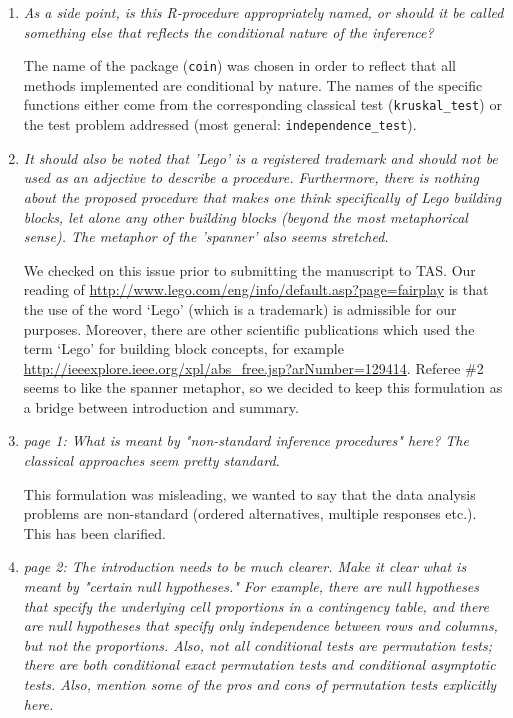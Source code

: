 \documentclass[11pt]{article}
\begin{document}
\begin{enumerate}
\item \textsl{As a side point, is this R-procedure appropriately named, or should it be called 
              something else that reflects the conditional nature of the inference?}

The name of the package (\texttt{coin}) was chosen in order to reflect that
all methods implemented are conditional by nature. The names of the specific
functions either come from the corresponding classical test
(\texttt{kruskal\_test}) or the test problem addressed (most general:
\texttt{independence\_test}).

\item \textsl{It should also be noted that 'Lego' is a registered trademark and should not be used 
              as an adjective to describe a procedure. Furthermore, there is nothing about the 
              proposed procedure that makes one think specifically of Lego building blocks, 
              let alone any other building blocks (beyond the most metaphorical sense). The 
              metaphor of the 'spanner' also seems stretched.}

We checked on this issue prior to submitting the manuscript to TAS. Our
reading of \url{http://www.lego.com/eng/info/default.asp?page=fairplay} is
that the use of the word `Lego' (which is a trademark) is admissible for our
purposes. Moreover, there are other scientific publications which used the
term `Lego' for building block concepts, for example
\url{http://ieeexplore.ieee.org/xpl/abs_free.jsp?arNumber=129414}.
Referee \#2 seems to like the spanner
metaphor, so we decided to keep this formulation as a bridge between
introduction and summary.


\item \textsl{page 1:  What is meant by "non-standard inference procedures" here? The classical 
              approaches seem pretty standard.}

This formulation was misleading, we wanted to say that the data analysis
problems are non-standard (ordered alternatives, multiple responses etc.).
This has been clarified.

\item \textsl{page 2:  The introduction needs to be much clearer. Make it clear what is meant by 
              "certain null hypotheses." For example, there are null hypotheses that specify the 
              underlying cell proportions in a contingency table, and there are null hypotheses 
              that specify only independence between rows and columns, but not the proportions. 
              Also, not all conditional tests are permutation tests; there are both conditional 
              exact permutation tests and conditional asymptotic tests. Also, mention some of 
              the pros and cons of permutation tests explicitly here.}


\end{enumerate}
\end{document}
